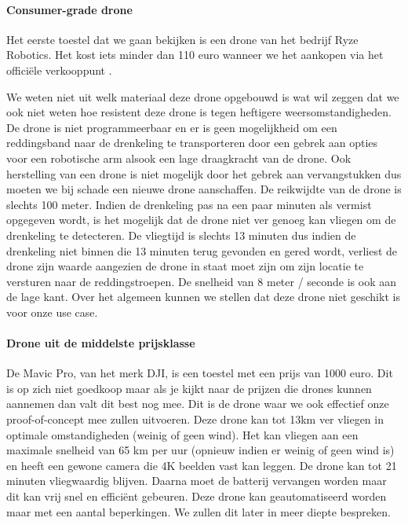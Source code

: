 \paragraph{Consumer-grade drone}

Het eerste toestel dat we gaan bekijken is een drone van het bedrijf Ryze Robotics. \autocite{CheapDrone} Het kost iets minder dan 110 euro wanneer we het aankopen via het officiële verkooppunt \autocite{CheapDroneOfficial}. 

We weten niet uit welk materiaal deze drone opgebouwd is wat wil zeggen dat we ook niet weten hoe resistent deze drone is tegen heftigere weersomstandigheden. De drone is niet programmeerbaar en er is geen mogelijkheid om een reddingsband naar de drenkeling te transporteren door een gebrek aan opties voor een robotische arm alsook een lage draagkracht van de drone. Ook herstelling van een drone is niet mogelijk door het gebrek aan vervangstukken dus moeten we bij schade een nieuwe drone aanschaffen. De reikwijdte van de drone is slechts 100 meter. Indien de drenkeling pas na een paar minuten als vermist opgegeven wordt, is het mogelijk dat de drone niet ver genoeg kan vliegen om de drenkeling te detecteren. De vliegtijd is slechts 13 minuten dus indien de drenkeling niet binnen die 13 minuten terug gevonden en gered wordt, verliest de drone zijn waarde aangezien de drone  in staat moet zijn om zijn locatie te versturen naar de reddingstroepen. De snelheid van 8 meter / seconde is ook aan de lage kant.
Over het algemeen kunnen we stellen dat deze drone niet geschikt is voor onze use case.

\paragraph{Drone uit de middelste prijsklasse}

De Mavic Pro, van het merk DJI, is een toestel met een prijs van 1000 euro. Dit is op zich niet goedkoop maar als je kijkt naar de prijzen die drones kunnen aannemen dan valt dit best nog mee. Dit is de drone waar we ook effectief onze proof-of-concept mee zullen uitvoeren. Deze drone kan tot 13km ver vliegen in optimale omstandigheden (weinig of geen wind). Het kan vliegen aan een maximale snelheid van 65 km per uur (opnieuw indien er weinig of geen wind is) en heeft een gewone camera die 4K beelden vast kan leggen. De drone kan tot 21 minuten vliegwaardig blijven. Daarna moet de batterij vervangen worden maar dit kan vrij snel en efficiënt gebeuren. Deze drone kan geautomatiseerd worden maar met een aantal beperkingen. We zullen dit later in meer diepte bespreken.

